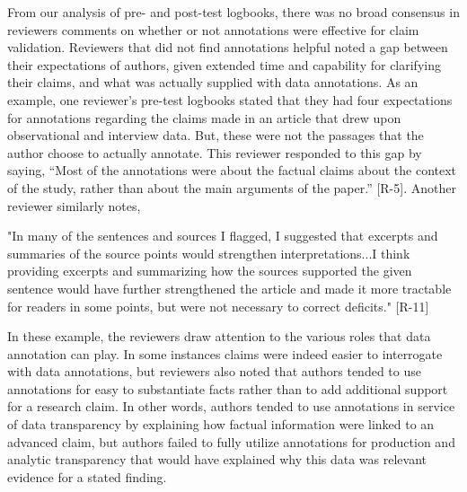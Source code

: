 \documentclass[sigchi]{acmart}
\begin{document}
From our analysis of pre- and post-test logbooks, there was no broad consensus in reviewers comments on whether or not annotations were effective for claim validation. Reviewers that did not find annotations helpful noted a gap between their expectations of authors, given extended time and capability for clarifying their claims, and what was actually supplied with data annotations. As an example, one reviewer’s pre-test logbooks stated that they had four expectations for annotations regarding the claims made in an article that drew upon observational and interview data. But, these were not the passages that the author choose to actually annotate. This reviewer responded to this gap by saying, “Most of the annotations were about the factual claims about the context of the study, rather than about the main arguments of the paper.” [R-5]. Another reviewer similarly notes, 

\begin{displayquote}"In many of the sentences and sources I flagged, I suggested that excerpts and summaries of the source points would strengthen interpretations...I think providing excerpts and summarizing how the sources supported the given sentence would have further strengthened the article and made it more tractable for readers in some points, but were not necessary to correct deficits." [R-11]\end{displayquote} 

In these example, the reviewers draw attention to the various roles that data annotation can play. In some instances claims were indeed easier to interrogate with data annotations, but reviewers also noted that authors tended to use annotations for easy to substantiate facts rather than to add additional support for a research claim. In other words, authors tended to use annotations in service of data transparency by explaining how factual information were linked to an advanced claim, but authors failed to fully utilize annotations for production and analytic transparency that would have explained why this data was relevant evidence for a stated finding. 
\end{document}
